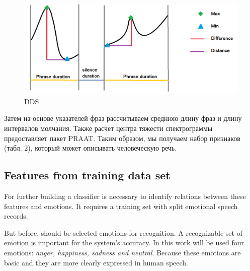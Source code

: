 \documentclass[14pt]{extarticle}
\begin{document}
\begin{figure}
	\centering
		\includegraphics[scale=0.5]{images/dds.png}
	\caption{DDS}
	\label{fig:dds}
\end{figure}
Затем на основе указателей фраз рассчитываем среднюю длину фраз и длину интервалов молчания. Также расчет центра тяжести спектрограммы предоставляет пакет PRAAT. Таким образом, мы получаем набор признаков (табл. 2), который может описывать человеческую речь.
\subsection{Features from training data set}
For further building a classifier is necessary to identify relations between these features and emotions. It requires a training set with split emotional speech records. 

But before, should be selected emotions for recognition. A recognizable set of emotion is important for the system's accuracy. In this work will be used four emotions: \emph{anger, happiness, sadness and neutral}. Because these emotions are basic and they are more clearly expressed in human speech.
\end{document}
